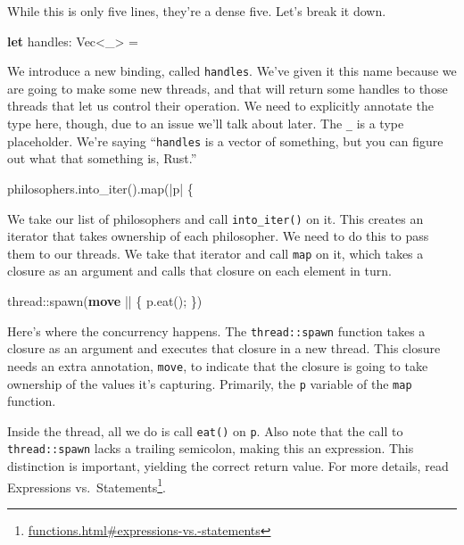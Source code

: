 \documentclass[a4paper,]{book}
\newenvironment{Shaded}{\begin{snugshade}}{\end{snugshade}}
\newcommand{\KeywordTok}[1]{\textcolor[rgb]{0.13,0.29,0.53}{\textbf{{#1}}}}
\newcommand{\DataTypeTok}[1]{\textcolor[rgb]{0.13,0.29,0.53}{{#1}}}
\newcommand{\NormalTok}[1]{{#1}}
\renewcommand{\href}[2]{#2\footnote{\url{#1}}}
\begin{document}
While this is only five lines, they're a dense five. Let's break it
down.

\begin{Shaded}
\begin{Highlighting}[]
\KeywordTok{let} \NormalTok{handles: }\DataTypeTok{Vec}\NormalTok{<_> =}
\end{Highlighting}
\end{Shaded}

We introduce a new binding, called \texttt{handles}. We've given it this
name because we are going to make some new threads, and that will return
some handles to those threads that let us control their operation. We
need to explicitly annotate the type here, though, due to an issue we'll
talk about later. The \texttt{\_} is a type placeholder. We're saying
``\texttt{handles} is a vector of something, but you can figure out what
that something is, Rust.''

\begin{Shaded}
\begin{Highlighting}[]
\NormalTok{philosophers.into_iter().map(|p| \{}
\end{Highlighting}
\end{Shaded}

We take our list of philosophers and call \texttt{into\_iter()} on it.
This creates an iterator that takes ownership of each philosopher. We
need to do this to pass them to our threads. We take that iterator and
call \texttt{map} on it, which takes a closure as an argument and calls
that closure on each element in turn.

\begin{Shaded}
\begin{Highlighting}[]
    \NormalTok{thread::spawn(}\KeywordTok{move} \NormalTok{|| \{}
        \NormalTok{p.eat();}
    \NormalTok{\})}
\end{Highlighting}
\end{Shaded}

Here's where the concurrency happens. The \texttt{thread::spawn}
function takes a closure as an argument and executes that closure in a
new thread. This closure needs an extra annotation, \texttt{move}, to
indicate that the closure is going to take ownership of the values it's
capturing. Primarily, the \texttt{p} variable of the \texttt{map}
function.

Inside the thread, all we do is call \texttt{eat()} on \texttt{p}. Also
note that the call to \texttt{thread::spawn} lacks a trailing semicolon,
making this an expression. This distinction is important, yielding the
correct return value. For more details, read
\href{functions.html\#expressions-vs.-statements}{Expressions
vs.~Statements}.
\end{document}
